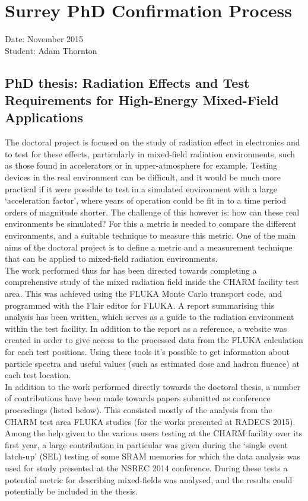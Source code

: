 \section*{Surrey PhD Confirmation Process}
Date: November 2015 \\
Student: Adam Thornton \\

\subsection*{PhD thesis: Radiation Effects and Test Requirements for High-Energy Mixed-Field Applications}

The doctoral project is focused on the study of radiation effect in electronics and to test for these effects, particularly in mixed-field radiation environments, such as those found in accelerators or in upper-atmosphere for example. Testing devices in the real environment can be difficult, and it would be much more practical if it were possible to test in a simulated environment with a large ‘acceleration factor’, where years of operation could be fit in to a time period orders of magnitude shorter. The challenge of this however is: how can these real environments be simulated? For this a metric is needed to compare the different environments, and a suitable technique to measure this metric. One of the main aims of the doctoral project is to define a metric and a measurement technique that can be applied to mixed-field radiation environments. \\

The work performed thus far has been directed towards completing a comprehensive study of the mixed radiation field inside the CHARM facility test area. This was achieved using the FLUKA Monte Carlo transport code, and programmed with the Flair editor for FLUKA. A report summarising this analysis has been written, which serves as a guide to the radiation environment within the test facility. In addition to the report as a reference, a website was created in order to give access to the processed data from the FLUKA calculation for each test positions. Using these tools it’s possible to get information about particle spectra and useful values (such as estimated dose and hadron fluence) at each test location. \\

In addition to the work performed directly towards the doctoral thesis, a number of contributions have been made towards papers submitted as conference proceedings (listed below). This consisted mostly of the analysis from the CHARM test area FLUKA studies (for the works presented at RADECS 2015). Among the help given to the various users testing at the CHARM facility over its first year, a large contribution in particular was given during the ‘single event latch-up’ (SEL) testing of some SRAM memories for which the data analysis was used for study presented at the NSREC 2014 conference. During these tests a potential metric for describing mixed-fields was analysed, and the results could potentially be included in the thesis. \\


